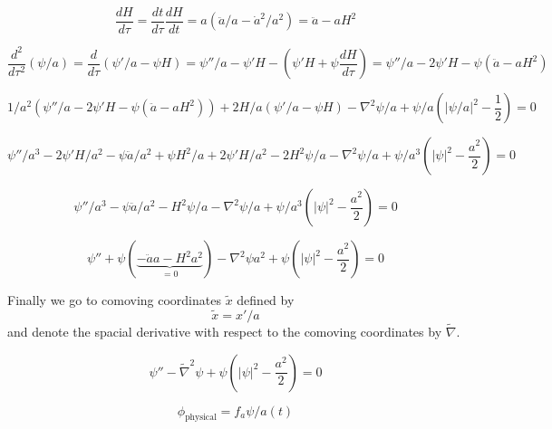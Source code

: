 \documentclass[a4paper]{article}
\begin{document}
\begin{equation}
    \frac{d H}{d \tau} = \frac{d t}{d \tau} \frac{d H}{d t} = a (\ddot{a} / a - \dot{a}^2 / a^2) = \ddot{a} - a H^2
\end{equation}

\begin{equation}
    \frac{d^2}{d \tau^2} (\psi / a) = \frac{d}{d \tau} (\psi' / a - \psi H)
    = \psi'' / a - \psi' H - (\psi' H + \psi \frac{d H}{d \tau})
    = \psi'' / a - 2 \psi' H - \psi ( \ddot{a} - a H^2 )
\end{equation}

\begin{equation}
    1/a^2 ( \psi'' / a - 2 \psi' H - \psi ( \ddot{a} - a H^2 ) ) + 2 H / a (\psi' / a - \psi H)
    - \nabla^2 \psi / a + \psi / a \left( |\psi / a|^2 - \frac{1}{2} \right) = 0
\end{equation}

\begin{equation}
    \psi'' / a^3 - 2 \psi' H / a^2 - \psi \ddot{a} / a^2 + \psi H^2 / a
    + 2 \psi' H / a^2 - 2 H^2 \psi / a
    - \nabla^2 \psi / a + \psi / a^3 ( |\psi|^2 - \frac{a^2}{2} ) = 0
\end{equation}

\begin{equation}
    \psi'' / a^3 - \psi \ddot{a} / a^2 - H^2 \psi / a
    - \nabla^2 \psi / a + \psi / a^3 ( |\psi|^2 - \frac{a^2}{2} ) = 0
\end{equation}

\begin{equation}
    \psi'' + \psi (\underbrace{- \ddot{a} a - H^2 a^2}_{= 0})
    - \nabla^2 \psi a^2 + \psi ( |\psi|^2 - \frac{a^2}{2} ) = 0
\end{equation}

Finally we go to comoving coordinates $\tilde{x}$ defined by
\begin{equation}
    \tilde{x} = x' / a
\end{equation}
and denote the spacial derivative with respect to the comoving coordinates by $\tilde{\nabla}$.

\begin{equation}
    \psi'' - \tilde{\nabla}^2 \psi + \psi ( |\psi|^2 - \frac{a^2}{2} ) = 0
\end{equation}

\begin{equation}
    \phi_\mathrm{physical} = f_a \psi / a(t)
\end{equation}
\end{document}

